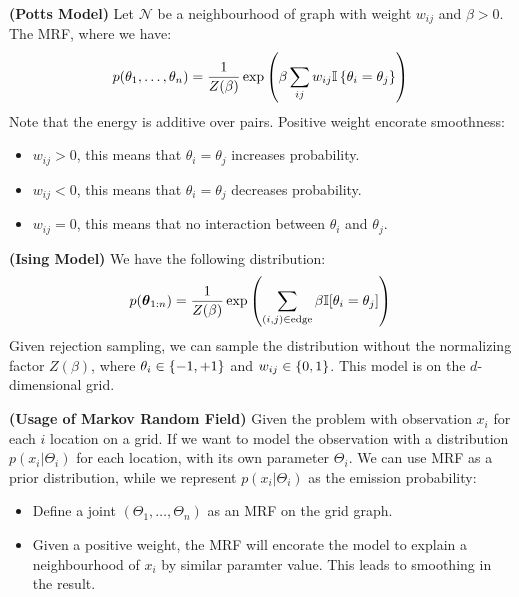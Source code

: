 \begin{definition}{\textbf{(Potts Model)}}
    Let $\mathcal{N}$ be a neighbourhood of graph with weight $w_{ij}$ and $\beta>0$. The MRF, where we have:
    \begin{equation*}
        p(\theta_1, \dots,\theta_n) = \frac{1}{Z(\beta)} \exp\left( \beta\sum_{ij}w_{ij} \mathbb{I}\left\{ \theta_i=\theta_j \right\} \right)
    \end{equation*}
    Note that the energy is additive over pairs. Positive weight encorate smoothness:
    \begin{itemize}
        \item $w_{ij}>0$, this means that $\theta_i=\theta_j$ increases probability. 
        \item $w_{ij}<0$, this means that $\theta_i=\theta_j$ decreases probability. 
        \item $w_{ij}=0$, this means that no interaction between $\theta_i$ and $\theta_j$.
    \end{itemize}
\end{definition}

\begin{definition}{\textbf{(Ising Model)}}
    We have the following distribution:
    \begin{equation*}
        p(\boldsymbol \theta_{1:n}) = \frac{1}{Z(\beta)} \exp\left( \sum_{(i, j) \in \text{edge}} \beta \mathbb{I}[\theta_i = \theta_j]  \right)
    \end{equation*}
    Given rejection sampling, we can sample the distribution without the normalizing factor $Z(\beta)$, where $\theta_i \in \left\{ -1, +1 \right\}$ and $w_{ij} \in \left\{ 0, 1 \right\}$. This model is on the $d$-dimensional grid.
\end{definition}

\begin{remark}{\textbf{(Usage of Markov Random Field)}}
    Given the problem with observation $x_i$ for each $i$ location on a grid. If we want to model the observation with a distribution $p(x_i | \Theta_i)$ for each location, with its own parameter $\Theta_i$. We can use MRF as a prior distribution, while we represent $p(x_i  | \Theta_i)$ as the emission probability:
    \begin{itemize}
        \item Define a joint $(\Theta_1,\dots,\Theta_n) $ as an MRF on the grid graph. 
        \item Given a positive weight, the MRF will encorate the model to explain a neighbourhood of $x_i$ by similar paramter value. This leads to smoothing in the result. 
    \end{itemize}
\end{remark}

